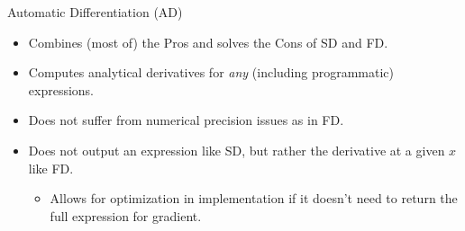 \begin{frame}{Automatic Differentiation (AD)}
\begin{itemize}
    \item Combines (most of) the Pros and solves the Cons of SD and FD.
    \item Computes analytical derivatives for \emph{any} (including programmatic) expressions.
    \item Does not suffer from numerical precision issues as in FD.
    \item Does not output an expression like SD, but rather the derivative at a given $x$
    like FD.
    \begin{itemize}
        \item Allows for optimization in implementation if it doesn't need to return 
        the full expression for gradient.
    \end{itemize}
\end{itemize}
\end{frame}